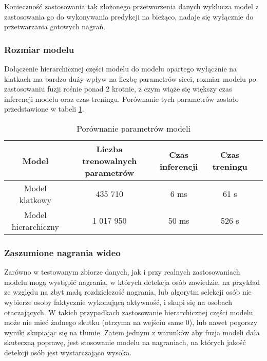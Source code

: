 Konieczność zastosowania tak złożonego przetworzenia danych wyklucza model z zastosowania go do wykonywania predykcji na bieżąco, nadaje się wyłącznie do przetwarzania gotowych nagrań. 
\subsubsection{Rozmiar modelu}
Dołączenie hierarchicznej części modelu do modelu opartego wyłącznie na klatkach ma bardzo duży wpływ na liczbę parametrów sieci, rozmiar modelu po zastosowaniu fuzji rośnie ponad 2 krotnie, z czym wiąże się większy czas inferencji modelu oraz czas treningu. Porównanie tych parametrów zostało przedstawione w tabeli \ref{tab:param-comp}. 
\begin{table}[!h]  \centering
\caption{Porównanie parametrów modeli}
\begin{tabular} {| c | c | c | c | r |} \hline
    Model & Liczba trenowalnych parametrów  & Czas inferencji& Czas treningu\\ \hline\hline
    Model klatkowy &  435 710	& 6 ms	& 61 s  \\ \hline
    Model hierarchiczny &  1 017 950	& 50 ms	& 526 s \\ \hline
\end{tabular}
\label{tab:param-comp}
\end{table}
\subsubsection{Zaszumione nagrania wideo}
Zarówno w testowanym zbiorze danych, jak i przy realnych zastosowaniach modelu mogą wystąpić nagrania, w których detekcja osób zawiedzie, na przykład ze względu na zbyt małą rozdzielczość nagrania, lub algorytm selekcji osób nie wybierze osoby faktycznie wykonującą aktywność, i skupi się na osobach otaczających. W takich przypadkach zastosowanie hierarchicznej części modelu może nie mieć żadnego skutku (otrzyma na wejściu same 0), lub nawet pogorszy wyniki skupiając się na tłumie. Zatem jednym z warunków aby fuzja modeli dała skuteczną poprawę, jest stosowanie modelu na nagraniach, na których jakość detekcji osób jest wystarczająco wysoka. 
